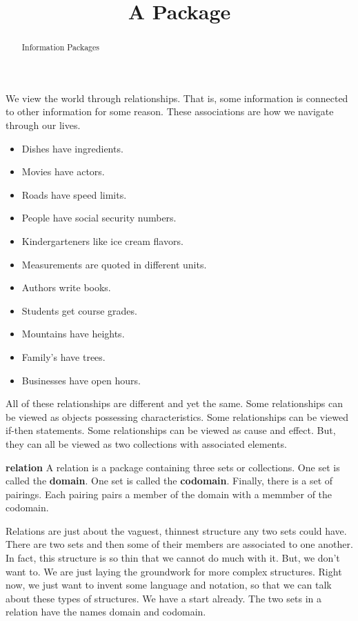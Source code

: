\documentclass{ximera}
\title{A Package}
\begin{document}
\begin{abstract}
Information Packages
\end{abstract}
\maketitle


We view the world through relationships. That is, some information is connected to other information for some reason. These associations are how we navigate through our lives.

\begin{itemize}
\item Dishes have ingredients.
\item Movies have actors.
\item Roads have speed limits.
\item People have social security numbers.
\item Kindergarteners like ice cream flavors.
\item Measurements are quoted in different units.
\item Authors write books.
\item Students get course grades.
\item Mountains have heights.
\item Family's have trees.
\item Businesses have open hours.
\end{itemize}


All of these relationships are different and yet the same.  Some relationships can be viewed as objects possessing characteristics. Some relationships can be viewed if-then statements.  Some relationships can be viewed as cause and effect. But, they can all be viewed as two collections with associated elements.
\\






\begin{definition} \textbf{relation} 
A relation is a package containing three sets or collections. One set is called the \textbf{domain}. One set is called the \textbf{codomain}.  Finally, there is a set of pairings.  Each pairing pairs a member of the domain with a memmber of the codomain.
\end{definition}

Relations are just about the vaguest, thinnest structure any two sets could have. There are two sets and then some of their members are associated to one another. In fact, this structure is so thin that we cannot do much with it.  But, we don't want to.  We are just laying the groundwork for more complex structures.  Right now, we just want to invent some language and notation, so that we can talk about these types of structures. We have a start already. The two sets in a relation have the names domain and codomain.
\\
\end{document}
